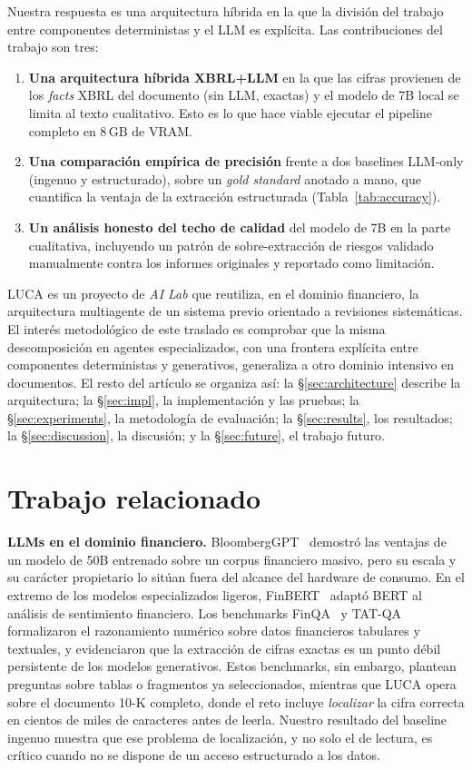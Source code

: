 \documentclass[conference]{IEEEtran}
\begin{document}
Nuestra respuesta es una arquitectura híbrida en la que la división del trabajo
entre componentes deterministas y el LLM es explícita. Las contribuciones del
trabajo son tres:

\begin{enumerate}
  \item \textbf{Una arquitectura híbrida XBRL+LLM} en la que las cifras provienen
  de los \textit{facts} XBRL del documento (sin LLM, exactas) y el modelo de 7B
  local se limita al texto cualitativo. Esto es lo que hace viable ejecutar el
  pipeline completo en 8\,GB de VRAM.
  \item \textbf{Una comparación empírica de precisión} frente a dos baselines
  LLM-only (ingenuo y estructurado), sobre un \textit{gold standard} anotado a
  mano, que cuantifica la ventaja de la extracción estructurada
  (Tabla~\ref{tab:accuracy}).
  \item \textbf{Un análisis honesto del techo de calidad} del modelo de 7B en la
  parte cualitativa, incluyendo un patrón de sobre-extracción de riesgos validado
  manualmente contra los informes originales y reportado como limitación.
\end{enumerate}

LUCA es un proyecto de \textit{AI Lab} que reutiliza, en el dominio financiero,
la arquitectura multiagente de un sistema previo orientado a revisiones
sistemáticas. El interés metodológico de este traslado es comprobar que la misma
descomposición en agentes especializados, con una frontera explícita entre
componentes deterministas y generativos, generaliza a otro dominio intensivo en
documentos. El resto del artículo se organiza así: la
\S\ref{sec:architecture} describe la arquitectura; la \S\ref{sec:impl}, la
implementación y las pruebas; la \S\ref{sec:experiments}, la metodología de
evaluación; la \S\ref{sec:results}, los resultados; la \S\ref{sec:discussion}, la
discusión; y la \S\ref{sec:future}, el trabajo futuro.

\section{Trabajo relacionado}
\textbf{LLMs en el dominio financiero.} BloombergGPT~\cite{wu2023bloomberggpt}
demostró las ventajas de un modelo de 50B entrenado sobre un corpus financiero
masivo, pero su escala y su carácter propietario lo sitúan fuera del alcance del
hardware de consumo. En el extremo de los modelos especializados ligeros,
FinBERT~\cite{araci2019finbert} adaptó BERT al análisis de sentimiento
financiero. Los benchmarks FinQA~\cite{chen2021finqa} y TAT-QA~\cite{zhu2021tatqa}
formalizaron el razonamiento numérico sobre datos financieros tabulares y
textuales, y evidenciaron que la extracción de cifras exactas es un punto débil
persistente de los modelos generativos. Estos benchmarks, sin embargo, plantean
preguntas sobre tablas o fragmentos ya seleccionados, mientras que LUCA opera
sobre el documento 10-K completo, donde el reto incluye \emph{localizar} la cifra
correcta en cientos de miles de caracteres antes de leerla. Nuestro resultado del
baseline ingenuo muestra que ese problema de localización, y no solo el de
lectura, es crítico cuando no se dispone de un acceso estructurado a los datos.
\end{document}
